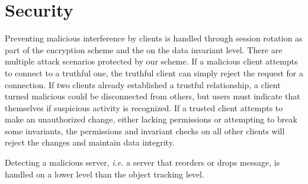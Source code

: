 \section{Security}
Preventing malicious interference by clients is handled through session rotation as part of the encryption scheme and the on the data invariant level. There are multiple attack scenarios protected by our scheme. If a malicious client attempts to connect to a truthful one, the truthful client can simply reject the request for a connection. If two clients already established a trustful relationship, a client turned malicious could be disconnected from others, but users must indicate that themselves if suspicious activity is recognized. If a trusted client attempts to make an unauthorized change, either lacking permissions or attempting to break some invariants, the permissions and invariant checks on all other clients will reject the changes and maintain data integrity.

Detecting a malicious server, \textit{i.e.} a server that reorders or drops message, is handled on a lower level than the object tracking level. 



